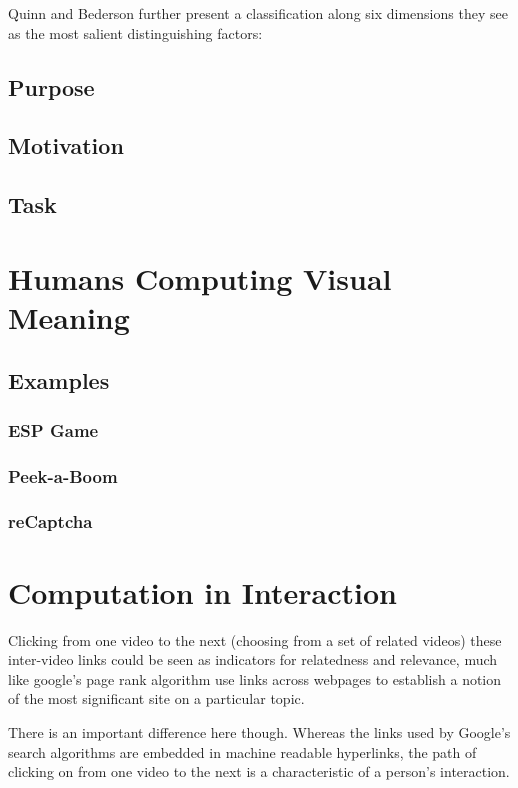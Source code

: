 Quinn and Bederson further present a classification along six dimensions they see as the most salient distinguishing factors: \cite{Quinn:2011us}



\subsection{Purpose}
\subsection{Motivation}
\subsection{Task}


\section{Humans Computing Visual Meaning}
\subsection{Examples}
\subsubsection{ESP Game}
\subsubsection{Peek-a-Boom}
\subsubsection{reCaptcha}




\section{Computation in Interaction}


Clicking from one video to the next (choosing from a set of related videos)
these inter-video links could be seen as indicators for relatedness and relevance, much like google's page rank algorithm use links across webpages to establish a notion of the most significant site on a particular topic. 

There is an important difference here though. Whereas the links used by Google's search algorithms are embedded in machine readable hyperlinks, the path of clicking on from one video to the next is a characteristic of a person's interaction. 

